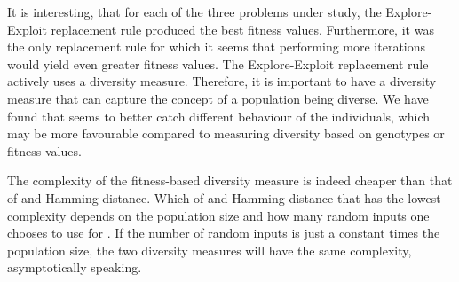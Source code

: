 It is interesting, that for each of the three problems under study, the Explore-Exploit replacement rule produced the best fitness values. Furthermore, it was the only replacement rule for which it seems that performing more iterations would yield even greater fitness values. 
The Explore-Exploit replacement rule actively uses a diversity measure.
Therefore, it is important to have a diversity measure that can capture the concept of a population being diverse.
We have found that \dia{} seems to better catch different behaviour of the individuals, which may be more favourable compared to measuring diversity based on genotypes or fitness values.

The complexity of the fitness-based diversity measure is indeed cheaper than that of \dia{} and Hamming distance.
Which of \dia{} and Hamming distance that has the lowest complexity depends on the population size and how many random inputs one chooses to use for \dia{}. If the number of random inputs is just a constant times the population size, the two diversity measures will have the same complexity, asymptotically speaking.